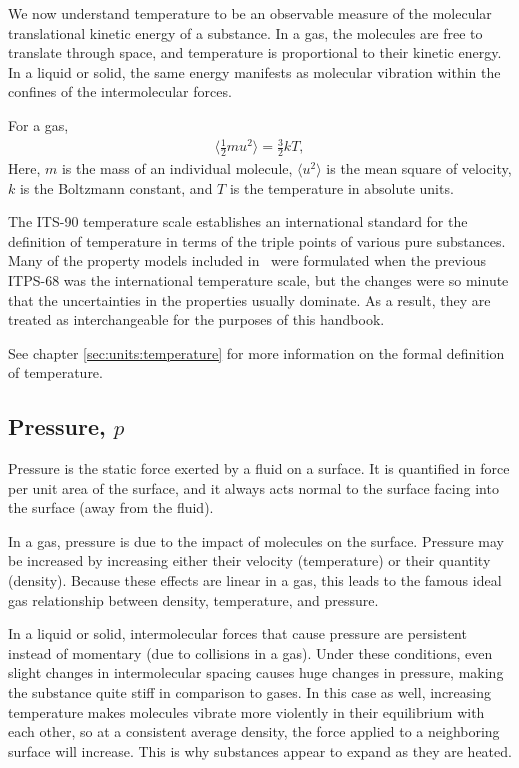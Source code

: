 We now understand temperature to be an observable measure of the molecular translational kinetic energy of a substance.  In a gas, the molecules are free to translate through space, and temperature is proportional to their kinetic energy.  In a liquid or solid, the same energy manifests as molecular vibration within the confines of the intermolecular forces.

For a gas,
\begin{align}
\langle \frac{1}{2} m u^2 \rangle = \frac{3}{2} k T,
\end{align}
Here, $m$ is the mass of an individual molecule, $\langle u^2 \rangle$ is the mean square of velocity, $k$ is the Boltzmann constant, and $T$ is the temperature in absolute units.

The ITS-90 temperature scale establishes an international standard for the definition of temperature in terms of the triple points of various pure substances.  Many of the property models included in \PM\ were formulated when the previous ITPS-68 was the international temperature scale, but the changes were so minute that the uncertainties in the properties usually dominate\cite[p.10]{janaf:1:1998}.  As a result, they are treated as interchangeable for the purposes of this handbook.

See chapter \ref{sec:units:temperature} for more information on the formal definition of temperature.

\subsection{Pressure, $p$}\label{sec:intro:p}

Pressure is the static force exerted by a fluid on a surface.  It is quantified in force per unit area of the surface, and it always acts normal to the surface facing into the surface (away from the fluid).  

In a gas, pressure is due to the impact of molecules on the surface.  Pressure may be increased by increasing either their velocity (temperature) or their quantity (density).  Because these effects are linear in a gas, this leads to the famous ideal gas relationship between density, temperature, and pressure.  

In a liquid or solid, intermolecular forces that cause pressure are persistent instead of momentary (due to collisions in a gas).  Under these conditions, even slight changes in intermolecular spacing causes huge changes in pressure, making the substance quite stiff in comparison to gases.  In this case as well, increasing temperature makes molecules vibrate more violently in their equilibrium with each other, so at a consistent average density, the force applied to a neighboring surface will increase.  This is why substances appear to expand as they are heated.

